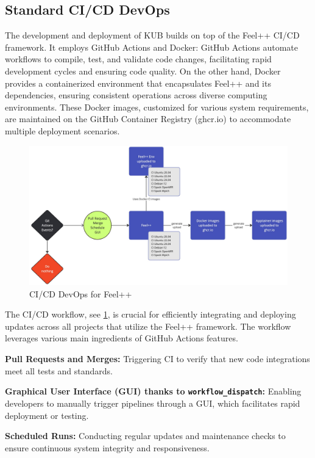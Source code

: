 \documentclass[runningheads]{llncs}
\begin{document}

\subsection{Standard CI/CD DevOps}
The development and deployment of KUB builds on top of the Feel++ CI/CD framework. It employs GitHub Actions and Docker: GitHub Actions automate workflows to compile, test, and validate code changes, facilitating rapid development cycles and ensuring code quality.
On the other hand, Docker provides a containerized environment that encapsulates Feel++ and its dependencies, ensuring consistent operations across diverse computing environments.
These Docker images, customized for various system requirements, are maintained on the GitHub Container Registry (ghcr.io) to accommodate multiple deployment scenarios.

\begin{figure}
    \centering
    \includegraphics[width=\textwidth]{img-feelpp-devops.pdf}
    \caption{CI/CD DevOps for Feel++}
    \label{fig:feelpp-devops}
\end{figure}
The CI/CD workflow, see \cref{fig:feelpp-devops}, is crucial for efficiently integrating and deploying updates across all projects that utilize the Feel++ framework. 
The workflow leverages various main ingredients of GitHub Actions features.
\begin{inparaenum}[\it (1)]
    \item \textbf{Pull Requests and Merges:} Triggering CI to verify that new code integrations meet all tests and standards.
    \item \textbf{Graphical User Interface (GUI) thanks to \texttt{workflow\_dispatch}:} Enabling developers to manually trigger pipelines through a GUI, which facilitates rapid deployment or testing.
    \item \textbf{Scheduled Runs:} Conducting regular updates and maintenance checks to ensure continuous system integrity and responsiveness.
\end{inparaenum}
\end{document}
